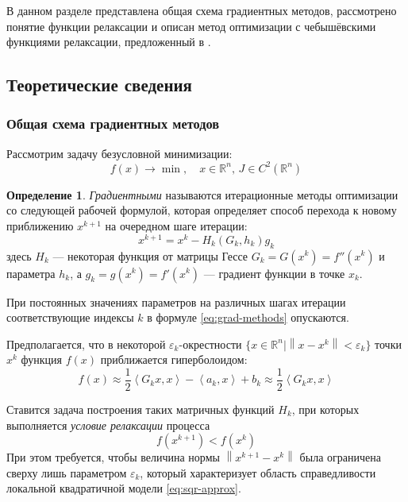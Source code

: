 \documentclass{article}
\renewcommand{\epsilon}{\varepsilon}
\providecommand{\neword}{\emph}
\providecommand{\norm}[1]{\left \lVert{#1}\right \rVert}
\providecommand{\set}[1]{\mathbb{#1}}
\newcommand{\scalmult}[1]{{\left \langle #1 \right \rangle}}
\theoremstyle{remark}
\theoremstyle{definition}
\newtheorem{dfn}{Определение}[section]
\numberwithin{equation}{section}
\begin{document}
В данном разделе представлена общая схема градиентных методов,
рассмотрено понятие функции релаксации и описан метод оптимизации с
чебышёвскими функциями релаксации, предложенный в
\cite{chernorutsky04}.

\subsection{Теоретические сведения}

\subsubsection{Общая схема градиентных методов}

Рассмотрим задачу безусловной минимизации:
\begin{equation*}
  f(x) \to \min,\quad x \in \set{R}^n,\, J \in C^2(\set{R}^n)
\end{equation*}

\begin{dfn}
  \neword{Градиентными} называются итерационные методы оптимизации со
  следующей рабочей формулой, которая определяет способ перехода к
  новому приближению $x^{k+1}$ на очередном шаге итерации:
  \begin{equation}
    \label{eq:grad-methods}
    x^{k+1} = x^k - H_k\left(G_k, h_k\right) g_k
  \end{equation}
  здесь $H_k$ — некоторая функция от матрицы Гессе $G_k = G(x^k) =
  f''(x^k)$ и параметра $h_k$, а $g_k = g(x^k) = f'(x^k)$ — градиент
  функции в точке $x_k$.
\end{dfn}

При постоянных значениях параметров на различных шагах итерации
соответствующие индексы $k$ в формуле \eqref{eq:grad-methods}
опускаются.

Предполагается, что в некоторой $\epsilon_k$-окрестности $\{x \in
\set{R}^n | \norm{x-x^k} < \epsilon_k\}$ точки $x^k$ функция $f(x)$
приближается гиперболоидом:
\begin{equation}
  \label{eq:sqr-approx}
  f(x) \approx \frac{1}{2}\scalmult{G_k x, x} - \scalmult{a_k,x} + b_k \approx \frac{1}{2}\scalmult{G_k x, x}
\end{equation}

Ставится задача построения таких матричных функций $H_k$, при которых
выполняется \emph{условие релаксации} процесса
\begin{equation}
  \label{eq:relax-cond}
  f(x^{k+1}) < f(x^k)
\end{equation}
При этом требуется, чтобы величина нормы $\norm{x^{k+1}-x^{k}}$ была
ограничена сверху лишь параметром $\epsilon_k$, который характеризует
область справедливости локальной квадратичной модели
\eqref{eq:sqr-approx}.
\end{document}
